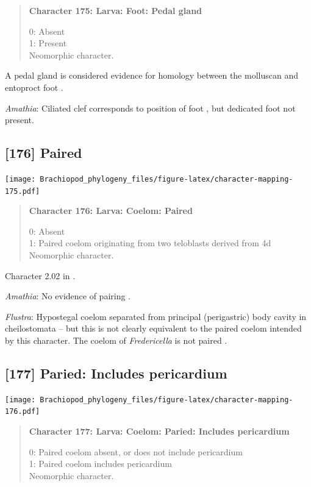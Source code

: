 \documentclass[openany]{book}
\begin{document}
\begin{quote}
\textbf{Character 175: Larva: Foot: Pedal gland}

0: Absent\\
1: Present\\
Neomorphic character.
\end{quote}

A pedal gland is considered evidence for homology between the molluscan
and entoproct foot \citep{Haszprunar2008}.

\hypertarget{Amathia-coding-175}{}
\emph{Amathia}: Ciliated clef corresponds to position of foot
\citep{Reed1982}, but dedicated foot not present.

\subsection*{{[}176{]} Paired}\label{paired}

\texttt{[image: Brachiopod\_phylogeny\_files/figure-latex/character-mapping-175.pdf]}

\begin{quote}
\textbf{Character 176: Larva: Coelom: Paired}

0: Absent\\
1: Paired coelom originating from two teloblasts derived from 4d\\
Neomorphic character.
\end{quote}

Character 2.02 in \citet{Scheltema1993}.

\hypertarget{Amathia-coding-176}{}
\emph{Amathia}: No evidence of pairing \citep{Reed1982}.

\hypertarget{Flustra-coding-176}{}
\emph{Flustra}: Hypostegal coelom separated from principal (perigastric)
body cavity in cheilostomata -- but this is not clearly equivalent to
the paired coelom intended by this character. The coelom of
\emph{Fredericella} is not paired \citep{Gruhl2010F}.

\subsection*{{[}177{]} Paried: Includes
pericardium}\label{paried-includes-pericardium}

\texttt{[image: Brachiopod\_phylogeny\_files/figure-latex/character-mapping-176.pdf]}

\begin{quote}
\textbf{Character 177: Larva: Coelom: Paried: Includes pericardium}

0: Paired coelom absent, or does not include pericardium\\
1: Paired coelom includes pericardium\\
Neomorphic character.
\end{quote}
\end{document}
